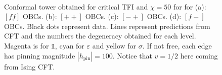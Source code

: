 \begin{figure}[h!]
		\hspace{-0.9cm}
		\begin{minipage}{\linewidth}
			\
		\end{minipage}
		\caption{Conformal tower obtained for critical TFI and $\chi=50$ for for (a): $[ff]$ OBCs. (b): $[++]$ OBCs. (c): $[-+]$ OBCs. (d): $[f-]$ OBCs. Black dots represent data. Lines represent predictions from CFT and the numbers the degeneracy obtained for each level. Magenta is for $\mathbb{1}$, cyan for $\varepsilon$ and yellow for $\sigma$. If not free, each edge has pinning magnitude $|h_\text{pin}|=100$. Notice that $v=1/2$ here coming from Ising CFT.}
		\label{fig:towersTFI}
	\end{figure}

